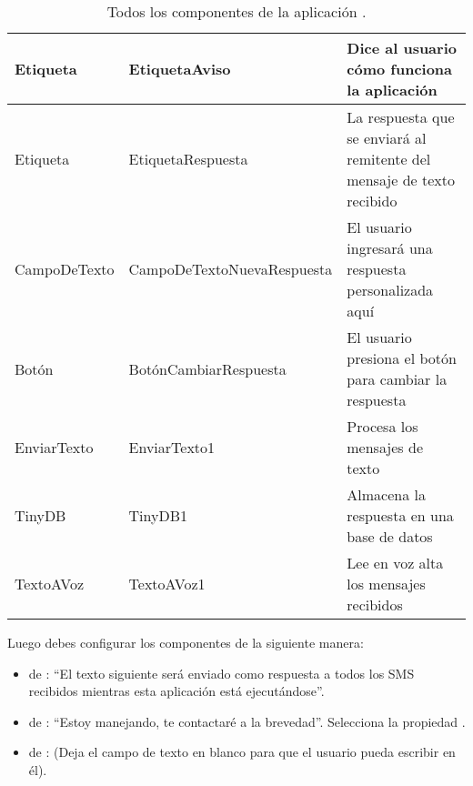 {\begin{table}
\begin{footnotesize}
\begin{tabular}{|l|l|m{4cm}|}
\hline

Etiqueta & EtiquetaAviso & Dice al usuario cómo
funciona la aplicación\\

\hline

Etiqueta & EtiquetaRespuesta & La respuesta que
se enviará al remitente del mensaje de texto recibido\\

\hline

CampoDeTexto & CampoDeTextoNuevaRespuesta & El usuario ingresará una
respuesta personalizada aquí\\

\hline

Botón & BotónCambiarRespuesta & El usuario presiona el botón para
cambiar la respuesta\\

\hline

EnviarTexto & EnviarTexto1 & Procesa los mensajes de texto\\

\hline

TinyDB & TinyDB1 & Almacena la respuesta en una base de datos\\

\hline

TextoAVoz & TextoAVoz1 & Lee en voz alta los mensajes recibidos\\

\hline

  \end{tabular}
\end{footnotesize}
\caption{Todos los componentes de la aplicación .}
\label{tab:NoSMS1}
\end{table}
%
Luego debes configurar los componentes de la siguiente manera:

\begin{itemize}

\item {} de : ``El texto
  siguiente será enviado como respuesta a todos los SMS recibidos
  mientras esta aplicación está ejecutándose''.

\item {} de : ``Estoy
  manejando, te contactaré a la brevedad''. Selecciona la propiedad
  .

\item {} de :
  (Deja el campo de texto en blanco para que el usuario pueda escribir
  en él).


\end{itemize}}
